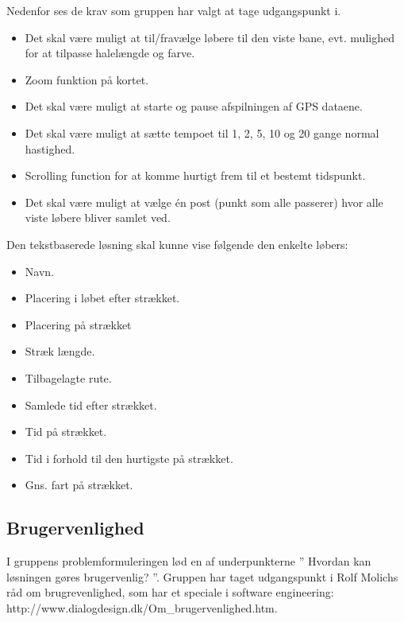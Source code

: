 Nedenfor ses de krav som gruppen har valgt at tage udgangspunkt i. 
\begin{itemize}
	\item Det skal være muligt at til/fravælge løbere til den viste bane, evt. mulighed for at tilpasse halelængde og farve.
	\item Zoom funktion på kortet.
	\item Det skal være muligt at starte og pause afspilningen af GPS dataene.
	\item Det skal være muligt at sætte tempoet til 1, 2, 5, 10 og 20 gange normal hastighed.
	\item Scrolling function for at komme hurtigt frem til et bestemt tidspunkt.
	\item Det skal være muligt at vælge én post (punkt som alle passerer) hvor alle viste løbere bliver samlet ved.
\end{itemize}
Den tekstbaserede løsning skal kunne vise følgende den enkelte løbers:
\begin{itemize}
	\item Navn.
	\item Placering i løbet efter strækket.
	\item Placering på strækket
	\item Stræk længde.
	\item Tilbagelagte rute.
	\item Samlede tid efter strækket.
	\item Tid på strækket.
	\item Tid i forhold til den hurtigste på strækket.
	\item Gns. fart på strækket.
\end{itemize}


\subsection{Brugervenlighed}
I gruppens problemformuleringen lød en af underpunkterne ” Hvordan kan løsningen gøres brugervenlig? ”. Gruppen har taget udgangspunkt i Rolf Molichs råd om brugrevenlighed, som har et speciale i software engineering: http://www.dialogdesign.dk/Om\_brugervenlighed.htm.

